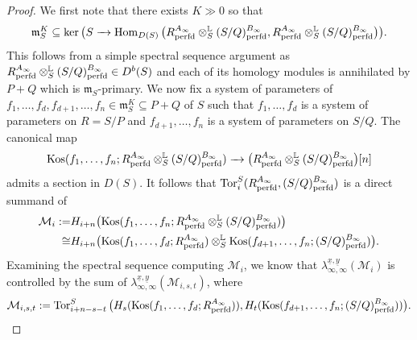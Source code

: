 \documentclass[12pt]{amsart}
\numberwithin{equation}{theorem}
\numberwithin{equation}{theorem}
\renewcommand{\m}{\mathfrak{m}}
\newcommand{\perfd}{\textnormal{perfd}}
\newcommand{\Kos}{\textnormal{Kos}}
\begin{document}
\begin{proof}
We first note that there exists $K\gg0$ so that
$$\m_S^K\subseteq \ker\big(S \to \Hom_{D(S)}\big(R^{A_\infty}_\perfd \otimes^\myL_S(S/Q)^{B_\infty}_\perfd, R^{A_\infty}_\perfd \otimes^\myL_S(S/Q)^{B_\infty}_\perfd\big)\big).$$
This follows from a simple spectral sequence argument as $R^{A_\infty}_\perfd \otimes^\myL_S(S/Q)^{B_\infty}_\perfd\in D^b(S)$ and each of its homology modules is annihilated by $P+Q$ which is $\m_S$-primary. We now fix a system of parameters of $f_1,\dots,f_d, f_{d+1},\dots, f_n \in\m_S^K \subseteq P+Q$ of $S$ such that $f_1,\dots,f_d$ is a system of parameters on $R=S/P$ and $f_{d+1},\dots,f_{n}$ is a system of parameters on $S/Q$. The canonical map
$$\Kos(f_1,\dots,f_n; R^{A_\infty}_\perfd \otimes^\myL_S(S/Q)^{B_\infty}_\perfd) \to \big(R^{A_\infty}_\perfd \otimes^\myL_S(S/Q)^{B_\infty}_\perfd\big)[n]$$
admits a section in $D(S)$. It follows that 
$\Tor_i^S(R^{A_\infty}_\perfd, (S/Q)^{B_\infty}_\perfd)$ is a direct summand of 
\begin{align*}
\mathcal{M}_i := & H_{i+n}\big(\Kos(f_1,\dots,f_n; R^{A_\infty}_\perfd \otimes^\myL_S(S/Q)^{B_\infty}_\perfd)\big) \\
\cong & H_{i+n}\big(\Kos(f_1,\dots,f_d; R^{A_\infty}_\perfd) \otimes^\myL_S \Kos(f_{d+1},\dots, f_n; (S/Q)^{B_\infty}_\perfd)\big).
\end{align*}
Examining the spectral sequence computing $\mathcal{M}_i$, we know that $\lambda_{\infty, \infty}^{\underline{x}, \underline{y}}(\mathcal{M}_i)$ is controlled by the sum of $\lambda_{\infty, \infty}^{\underline{x}, \underline{y}}(\mathcal{M}_{i,s,t})$, where 
$$\mathcal{M}_{i,s,t} :=\Tor_{i+n-s-t}^S\big(H_s(\Kos(f_1,\dots,f_d; R^{A_\infty}_\perfd)), H_t(\Kos(f_{d+1},\dots, f_n; (S/Q)^{B_\infty}_\perfd))\big).$$


\end{proof}
\end{document}
